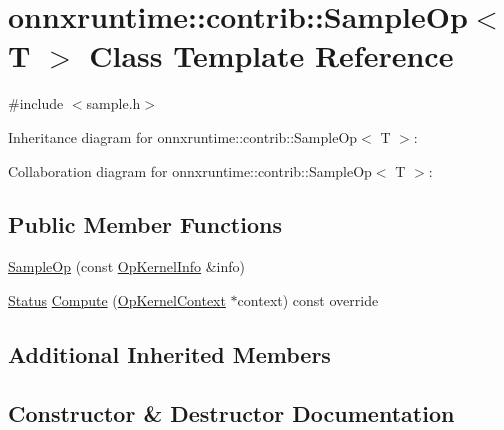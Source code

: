 \hypertarget{classonnxruntime_1_1contrib_1_1SampleOp}{}\section{onnxruntime\+:\+:contrib\+:\+:Sample\+Op$<$ T $>$ Class Template Reference}
\label{classonnxruntime_1_1contrib_1_1SampleOp}


{\ttfamily \#include $<$sample.\+h$>$}



Inheritance diagram for onnxruntime\+:\+:contrib\+:\+:Sample\+Op$<$ T $>$\+:


Collaboration diagram for onnxruntime\+:\+:contrib\+:\+:Sample\+Op$<$ T $>$\+:
\subsection*{Public Member Functions}
\begin{DoxyCompactItemize}
\item 
\mbox{\hyperlink{classonnxruntime_1_1contrib_1_1SampleOp_a56e4ca8b49d465f67be258f623a69fd4}{Sample\+Op}} (const \mbox{\hyperlink{classonnxruntime_1_1OpKernelInfo}{Op\+Kernel\+Info}} \&info)
\item 
\mbox{\hyperlink{classonnxruntime_1_1common_1_1Status}{Status}} \mbox{\hyperlink{classonnxruntime_1_1contrib_1_1SampleOp_a492aa20d46920d99aced3e7c355d844d}{Compute}} (\mbox{\hyperlink{classonnxruntime_1_1OpKernelContext}{Op\+Kernel\+Context}} $\ast$context) const override
\end{DoxyCompactItemize}
\subsection*{Additional Inherited Members}


\subsection{Constructor \& Destructor Documentation}
\mbox{\label{classonnxruntime_1_1contrib_1_1SampleOp_a56e4ca8b49d465f67be258f623a69fd4}} 

